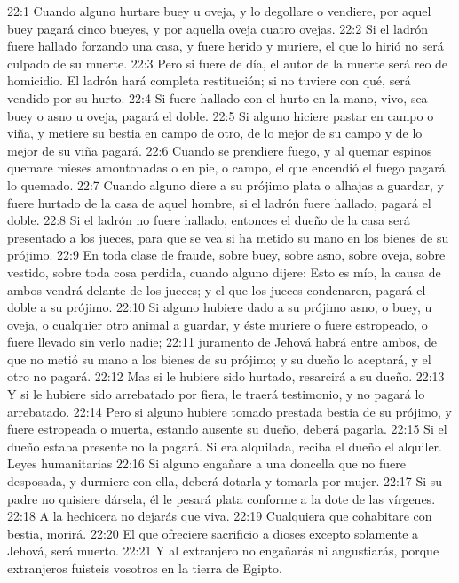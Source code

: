 22:1 Cuando alguno hurtare buey u oveja, y lo degollare o vendiere, por aquel buey pagará cinco bueyes, y por aquella oveja cuatro ovejas. 
22:2 Si el ladrón fuere hallado forzando una casa, y fuere herido y muriere, el que lo hirió no será culpado de su muerte. 
22:3 Pero si fuere de día, el autor de la muerte será reo de homicidio. El ladrón hará completa restitución; si no tuviere con qué, será vendido por su hurto. 
22:4 Si fuere hallado con el hurto en la mano, vivo, sea buey o asno u oveja, pagará el doble. 
22:5 Si alguno hiciere pastar en campo o viña, y metiere su bestia en campo de otro, de lo mejor de su campo y de lo mejor de su viña pagará. 
22:6 Cuando se prendiere fuego, y al quemar espinos quemare mieses amontonadas o en pie, o campo, el que encendió el fuego pagará lo quemado. 
22:7 Cuando alguno diere a su prójimo plata o alhajas a guardar, y fuere hurtado de la casa de aquel hombre, si el ladrón fuere hallado, pagará el doble. 
22:8 Si el ladrón no fuere hallado, entonces el dueño de la casa será presentado a los jueces, para que se vea si ha metido su mano en los bienes de su prójimo. 
22:9 En toda clase de fraude, sobre buey, sobre asno, sobre oveja, sobre vestido, sobre toda cosa perdida, cuando alguno dijere: Esto es mío, la causa de ambos vendrá delante de los jueces; y el que los jueces condenaren, pagará el doble a su prójimo. 
22:10 Si alguno hubiere dado a su prójimo asno, o buey, u oveja, o cualquier otro animal a guardar, y éste muriere o fuere estropeado, o fuere llevado sin verlo nadie; 
22:11 juramento de Jehová habrá entre ambos, de que no metió su mano a los bienes de su prójimo; y su dueño lo aceptará, y el otro no pagará. 
22:12 Mas si le hubiere sido hurtado, resarcirá a su dueño. 
22:13 Y si le hubiere sido arrebatado por fiera, le traerá testimonio, y no pagará lo arrebatado. 
22:14 Pero si alguno hubiere tomado prestada bestia de su prójimo, y fuere estropeada o muerta, estando ausente su dueño, deberá pagarla. 
22:15 Si el dueño estaba presente no la pagará. Si era alquilada, reciba el dueño el alquiler. 
Leyes humanitarias 
22:16 Si alguno engañare a una doncella que no fuere desposada, y durmiere con ella, deberá dotarla y tomarla por mujer. 
22:17 Si su padre no quisiere dársela, él le pesará plata conforme a la dote de las vírgenes. 
22:18 A la hechicera no dejarás que viva. 
22:19 Cualquiera que cohabitare con bestia, morirá. 
22:20 El que ofreciere sacrificio a dioses excepto solamente a Jehová, será muerto. 
22:21 Y al extranjero no engañarás ni angustiarás, porque extranjeros fuisteis vosotros en la tierra de Egipto. 
